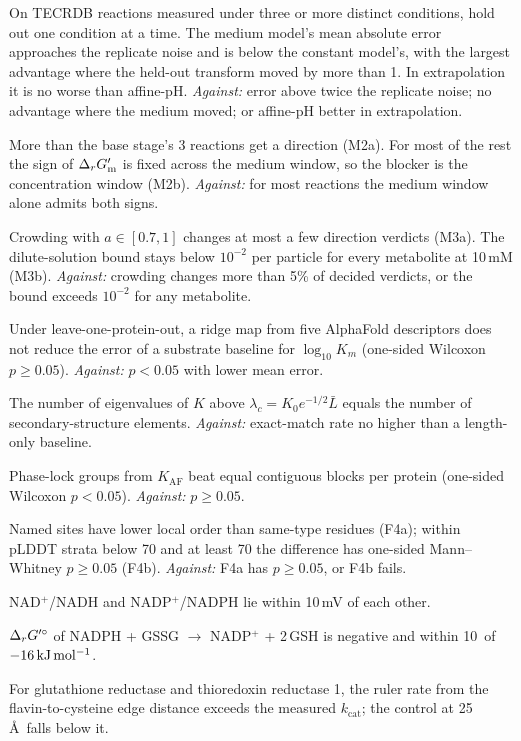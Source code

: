 \begin{description}[style=nextline,leftmargin=1.2cm,itemsep=3pt]
\item[M1] On TECRDB reactions measured under three or more distinct conditions, hold out one condition at a time.
The medium model's mean absolute error approaches the replicate noise and is below the constant model's, with the largest advantage where the held-out transform moved by more than 1\kJ.
In extrapolation it is no worse than affine-pH.
\emph{Against:} error above twice the replicate noise; no advantage where the medium moved; or affine-pH better in extrapolation.
\item[M2] More than the base stage's 3 reactions get a direction (M2a).
For most of the rest the sign of $\Delta_r G'_{\mathrm{m}}$ is fixed across the medium window, so the blocker is the concentration window (M2b).
\emph{Against:} for most reactions the medium window alone admits both signs.
\item[M3] Crowding with $a\in[0.7,1]$ changes at most a few direction verdicts (M3a).
The dilute-solution bound stays below $10^{-2}$ per particle for every metabolite at 10\,mM (M3b).
\emph{Against:} crowding changes more than 5\% of decided verdicts, or the bound exceeds $10^{-2}$ for any metabolite.
\item[K1] Under leave-one-protein-out, a ridge map from five AlphaFold descriptors does not reduce the error of a substrate baseline for $\log_{10}K_m$ (one-sided Wilcoxon $p\ge0.05$).
\emph{Against:} $p<0.05$ with lower mean error.
\item[F2] The number of eigenvalues of $K$ above $\lambda_c=K_0e^{-1/2}\bar L$ equals the number of secondary-structure elements.
\emph{Against:} exact-match rate no higher than a length-only baseline.
\item[F3] Phase-lock groups from $K_{\mathrm{AF}}$ beat equal contiguous blocks per protein (one-sided Wilcoxon $p<0.05$).
\emph{Against:} $p\ge0.05$.
\item[F4] Named sites have lower local order than same-type residues (F4a); within pLDDT strata below 70 and at least 70 the difference has one-sided Mann--Whitney $p\ge0.05$ (F4b).
\emph{Against:} F4a has $p\ge0.05$, or F4b fails.
\item[E4a] NAD$^+$/NADH and NADP$^+$/NADPH lie within 10\,mV of each other.
\item[E4b] $\Delta_r G'^\circ$ of NADPH + GSSG $\to$ NADP$^+$ + 2\,GSH is negative and within 10\kJ\ of $-16\,\mathrm{kJ\,mol^{-1}}$.
\item[E4c] For glutathione reductase and thioredoxin reductase 1, the ruler rate from the flavin-to-cysteine edge distance exceeds the measured $k_{\mathrm{cat}}$; the control at 25\,\AA\ falls below it.

\end{description}
